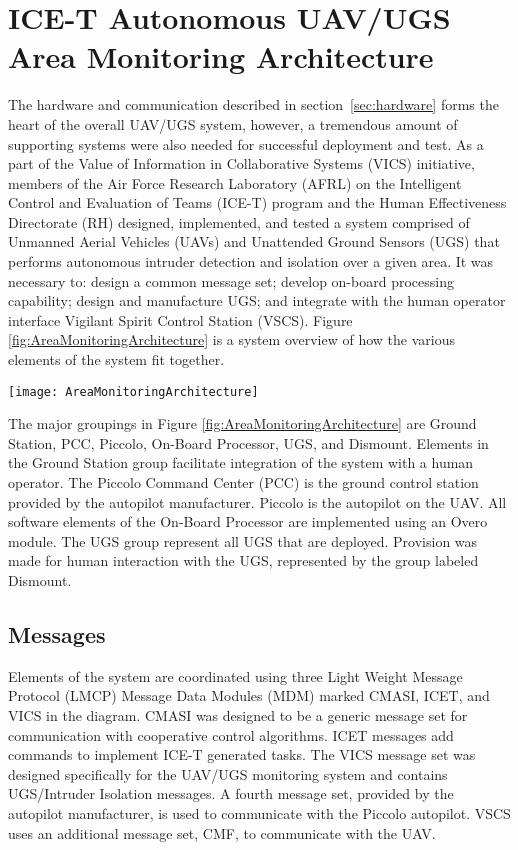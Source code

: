 \documentclass[letterpaper, 12 pt, conference]{ieeeconf}  %
\DeclareRobustCommand{\overo}{Overo\textsuperscript{\textregistered}}
\theoremstyle{definition}
\begin{document}
\section{ICE-T Autonomous UAV/UGS Area Monitoring Architecture}
The hardware and communication described in section~\ref{sec:hardware} forms the heart of the overall UAV/UGS system, however, a tremendous amount of supporting systems were also needed for successful deployment and test. As a part of the Value of Information in Collaborative Systems (VICS) initiative, members of the Air Force Research Laboratory (AFRL) on the Intelligent Control and Evaluation of Teams (ICE-T) program and the Human Effectiveness Directorate (RH) designed, implemented, and tested a system comprised of Unmanned Aerial Vehicles (UAVs) and Unattended Ground Sensors (UGS) that performs autonomous intruder detection and isolation over a given area. It was necessary to: design a common message set; develop on-board processing capability; design and manufacture UGS; and integrate with the human operator interface Vigilant Spirit Control Station (VSCS). Figure \ref{fig:AreaMonitoringArchitecture} is a system overview of how the various elements of the system fit together.


\begin{figure*}[thb]
\centering
      \texttt{[image: AreaMonitoringArchitecture]}
      \caption{Area Monitoring Architecture}
      \label{fig:AreaMonitoringArchitecture}
\end{figure*}


The major groupings in Figure \ref{fig:AreaMonitoringArchitecture} are Ground Station, PCC, Piccolo, On-Board Processor, UGS, and Dismount. Elements in the Ground Station group facilitate integration of the system with a human operator. The Piccolo Command Center (PCC) is the ground control station provided by the autopilot manufacturer. Piccolo is the autopilot on the UAV. All software elements of the On-Board Processor are implemented using an \overo~ module. The UGS group represent all UGS that are deployed. Provision was made for human interaction with the UGS, represented by the group labeled Dismount.

\subsection{Messages}
Elements of the system are coordinated using three Light Weight Message Protocol (LMCP) Message Data Modules (MDM) marked CMASI, ICET, and VICS in the diagram. CMASI was designed to be a generic message set for communication with cooperative control algorithms.
ICET messages add commands to implement ICE-T generated tasks. The VICS message set was designed specifically for the UAV/UGS monitoring system and contains UGS/Intruder Isolation messages.
A fourth message set, provided by the autopilot manufacturer, is used to communicate with the Piccolo autopilot. VSCS uses an additional message set, CMF, to communicate with the UAV.
\end{document}
